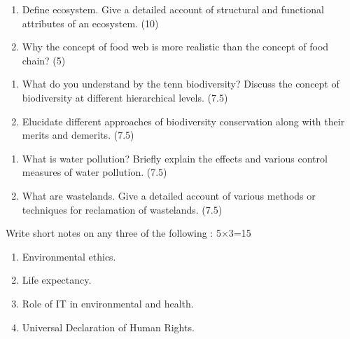 \documentclass[12pt,a4paper]{article}
\begin{document}
\begin{questions}
    \vspace{\baselineskip}
    
    \item \begin{enumerate}[label=(\alph*), leftmargin=2em]
        \item Define ecosystem. Give a detailed account of structural and functional attributes of an ecosystem. \hfill (10)
        \item Why the concept of food web is more realistic than the concept of food chain? \hfill (5)
    \end{enumerate}

    \vspace{\baselineskip}
    
    \item \begin{enumerate}[label=(\alph*), leftmargin=2em]
        \item What do you understand by the tenn biodiversity? Discuss the concept of biodiversity at different hierarchical levels. \hfill (7.5)
        \item Elucidate different approaches of biodiversity conservation along with their merits and demerits. \hfill (7.5)
    \end{enumerate}

    \vspace{\baselineskip}
    
    \item \begin{enumerate}[label=(\alph*), leftmargin=2em]
        \item What is water pollution? Briefly explain the effects and various control measures of water pollution.  \hfill (7.5)
        \item What are wastelands. Give a detailed account of various methods or techniques for reclamation of wastelands. \hfill (7.5)
    \end{enumerate}

    \vspace{\baselineskip}
    
    \item Write short notes on any three of the following : \hfill 5×3=15
    \begin{enumerate}[label=(\roman*), leftmargin=2em]
    \item Environmental ethics. 
    \item Life expectancy. 
    \item Role of IT in environmental and health. 
    \item Universal Declaration of Human Rights.
    \end{enumerate}

\end{questions}
\end{document}
